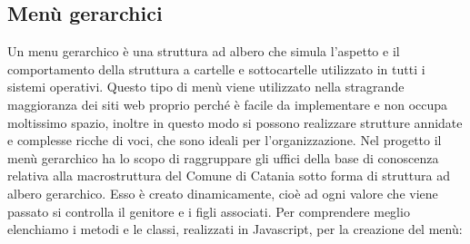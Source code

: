 \documentclass[a4paper,11pt]{article}
\begin{document}
\subsection{Menù gerarchici}
\label{sec:5.1}
Un menu gerarchico è una struttura ad albero che simula l'aspetto e il comportamento della struttura a cartelle e sottocartelle utilizzato in tutti i sistemi operativi. Questo tipo di menù viene utilizzato nella stragrande maggioranza dei siti web proprio perché è facile da implementare e non occupa moltissimo spazio, inoltre in questo modo si possono realizzare strutture annidate e complesse ricche di voci, che sono ideali per l'organizzazione.\newline 
Nel progetto il menù gerarchico ha lo scopo di raggruppare gli uffici della base di conoscenza relativa alla macrostruttura del Comune di Catania sotto forma di struttura ad albero gerarchico. Esso è creato dinamicamente, cioè ad ogni valore che viene passato si controlla il genitore e i figli associati.
Per comprendere meglio elenchiamo i metodi e le classi, realizzati in Javascript, per la creazione del menù:
\end{document}
